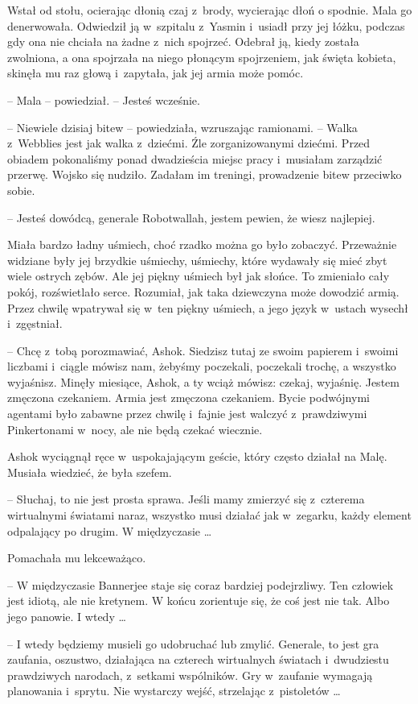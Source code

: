 \documentclass[oneside,polish,11pt,rmheadings]{mwbk}
\begin{document}
Wstał od stołu, ocierając dłonią czaj z~brody, wycierając dłoń o spodnie. Mala go denerwowała. Odwiedził ją w~szpitalu z~Yasmin i~usiadł przy jej łóżku, podczas gdy ona nie chciała na żadne z~nich spojrzeć. Odebrał ją, kiedy została zwolniona, a ona spojrzała na niego płonącym spojrzeniem, jak święta kobieta, skinęła mu raz głową i~zapytała, jak jej armia może pomóc.

-- Mala -- powiedział. -- Jesteś wcześnie. 

-- Niewiele dzisiaj bitew -- powiedziała, wzruszając ramionami. -- Walka z~Webblies jest jak walka z~dziećmi. Źle zorganizowanymi dziećmi. Przed obiadem pokonaliśmy ponad dwadzieścia miejsc pracy i~musiałam zarządzić przerwę. Wojsko się nudziło. Zadałam im treningi, prowadzenie bitew przeciwko sobie.

-- Jesteś dowódcą, generale Robotwallah, jestem pewien, że wiesz najlepiej.

Miała bardzo ładny uśmiech, choć rzadko można go było zobaczyć. Przeważnie widziane były jej brzydkie uśmiechy, uśmiechy, które wydawały się mieć zbyt wiele ostrych zębów. Ale jej piękny uśmiech był jak słońce. To zmieniało cały pokój, rozświetlało serce. Rozumiał, jak taka dziewczyna może dowodzić armią. Przez chwilę wpatrywał się w~ten piękny uśmiech, a jego język w~ustach wysechł i~zgęstniał.

-- Chcę z~tobą porozmawiać, Ashok. Siedzisz tutaj ze swoim papierem i~swoimi liczbami i~ciągle mówisz nam, żebyśmy poczekali, poczekali trochę, a wszystko wyjaśnisz. Minęły miesiące, Ashok, a ty wciąż mówisz: czekaj, wyjaśnię. Jestem zmęczona czekaniem. Armia jest zmęczona czekaniem. Bycie podwójnymi agentami było zabawne przez chwilę i~fajnie jest walczyć z~prawdziwymi Pinkertonami w~nocy, ale nie będą czekać wiecznie.

Ashok wyciągnął ręce w~uspokajającym geście, który często działał na Malę. Musiała wiedzieć, że była szefem. 

-- Słuchaj, to nie jest prosta sprawa. Jeśli mamy zmierzyć się z~czterema wirtualnymi światami naraz, wszystko musi działać jak w~zegarku, każdy element odpalający po drugim. W międzyczasie \ldots 

Pomachała mu lekceważąco. 

-- W międzyczasie Bannerjee staje się coraz bardziej podejrzliwy. Ten człowiek jest idiotą, ale nie kretynem. W końcu zorientuje się, że coś jest nie tak. Albo jego panowie. I wtedy \ldots 

-- I wtedy będziemy musieli go udobruchać lub zmylić. Generale, to jest gra zaufania, oszustwo, działająca na czterech wirtualnych światach i~dwudziestu prawdziwych narodach, z~setkami wspólników. Gry w~zaufanie wymagają planowania i~sprytu. Nie wystarczy wejść, strzelając z~pistoletów \ldots 
\end{document}
